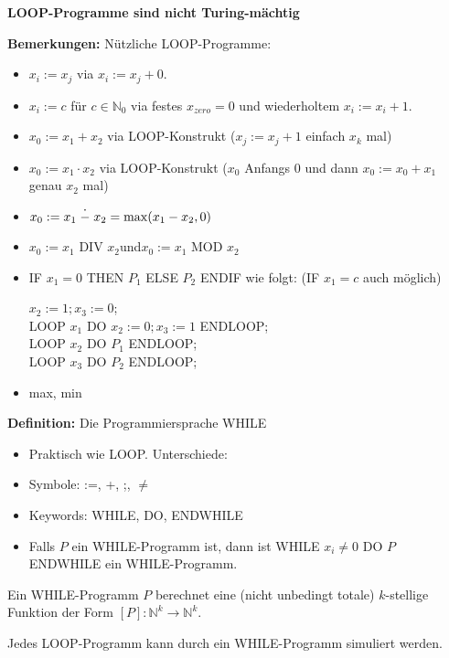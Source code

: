 \documentclass[a4paper,graphics,11pt]{article}
\newcommand{\up}[2]{\mathrel{\overset{\makebox[0pt]{\mbox{\normalfont\tiny #2}}}{#1}}}
\begin{document}
\textbf{LOOP-Programme sind nicht Turing-mächtig}

\strut

\textbf{Bemerkungen:} Nützliche LOOP-Programme:
\begin{itemize}
    \item $x_i := x_j$ via $x_i := x_j + 0$.
    \item $x_i := c$ für $c \in \mathbb{N}_0$ via festes $x_{zero} = 0$ und wiederholtem $x_i := x_i + 1$.
    \item $x_0 := x_1 + x_2$ via LOOP-Konstrukt ($x_j := x_j + 1$ einfach $x_k$ mal)
    \item $x_0 := x_1 \cdot x_2$ via LOOP-Konstrukt ($x_0$ Anfangs 0 und dann $x_0 := x_0 + x_1$ genau $x_2$ mal)
    \item $x_0 := x_1 \up{-}{\large.} x_2 = \max(x_1-x_2,0)$
    \item $x_0 := x_1 \text{ DIV } x_2$\quad und\quad $x_0 := x_1 \text{ MOD } x_2$
    \item IF $x_1 = 0$ THEN $P_1$ ELSE $P_2$ ENDIF wie folgt: (IF $x_1 = c$ auch möglich)

        $x_2 := 1; x_3 := 0$;\\
        LOOP $x_1$ DO $x_2 := 0;x_3 := 1$ ENDLOOP;\\
        LOOP $x_2$ DO $P_1$ ENDLOOP;\\
        LOOP $x_3$ DO $P_2$ ENDLOOP;\\
    \item max, min
\end{itemize}

\newpage

\textbf{Definition:} Die Programmiersprache WHILE
\begin{itemize}
    \item Praktisch wie LOOP. Unterschiede:
    \item Symbole: :=, +, ;, {\color{red}$\neq$}
    \item Keywords: WHILE, DO, ENDWHILE
    \\
    \item Falls $P$ ein WHILE-Programm ist, dann ist WHILE $x_i \neq 0$ DO $P$ ENDWHILE ein WHILE-Programm.
\end{itemize}

Ein WHILE-Programm $P$ berechnet eine (nicht unbedingt totale) $k$-stellige Funktion der Form
$[P] : \mathbb{N}^k \to \mathbb{N}^k$.

Jedes LOOP-Programm kann durch ein WHILE-Programm simuliert werden.
\end{document}
